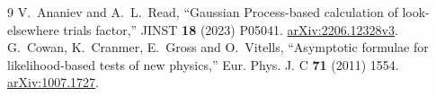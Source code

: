 \documentclass[11pt]{article}
\begin{document}
\begin{thebibliography}{9}
 V.~Ananiev and A.~L.~Read, ``Gaussian Process-based calculation of look-elsewhere trials factor,'' JINST \textbf{18} (2023) P05041. \href{https://arxiv.org/abs/2206.12328v3}{arXiv:2206.12328v3}.
 G.~Cowan, K.~Cranmer, E.~Gross and O.~Vitells, ``Asymptotic formulae for likelihood-based tests of new physics,'' Eur. Phys. J. C \textbf{71} (2011) 1554. \href{https://arxiv.org/abs/1007.1727}{arXiv:1007.1727}.
\end{thebibliography}
\end{document}
